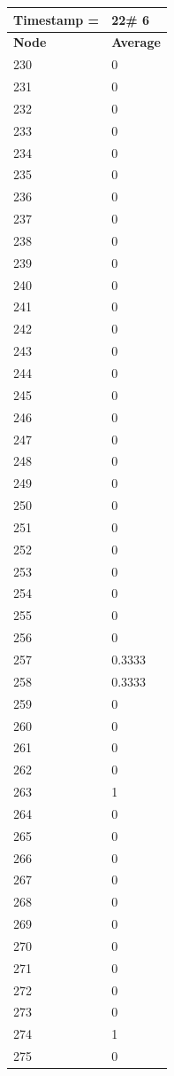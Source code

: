 \begin{tabular}{|l||l|}
\hline
\textbf{Timestamp =} & \textbf{22}\# 6\\\hline
	\textbf{Node} & \textbf{Average} \\ \hline
\hline
	230 & 0 \\ \hline
	231 & 0 \\ \hline
	232 & 0 \\ \hline
	233 & 0 \\ \hline
	234 & 0 \\ \hline
	235 & 0 \\ \hline
	236 & 0 \\ \hline
	237 & 0 \\ \hline
	238 & 0 \\ \hline
	239 & 0 \\ \hline
	240 & 0 \\ \hline
	241 & 0 \\ \hline
	242 & 0 \\ \hline
	243 & 0 \\ \hline
	244 & 0 \\ \hline
	245 & 0 \\ \hline
	246 & 0 \\ \hline
	247 & 0 \\ \hline
	248 & 0 \\ \hline
	249 & 0 \\ \hline
	250 & 0 \\ \hline
	251 & 0 \\ \hline
	252 & 0 \\ \hline
	253 & 0 \\ \hline
	254 & 0 \\ \hline
	255 & 0 \\ \hline
	256 & 0 \\ \hline
	257 & 0.3333 \\ \hline
	258 & 0.3333 \\ \hline
	259 & 0 \\ \hline
	260 & 0 \\ \hline
	261 & 0 \\ \hline
	262 & 0 \\ \hline
	263 & 1 \\ \hline
	264 & 0 \\ \hline
	265 & 0 \\ \hline
	266 & 0 \\ \hline
	267 & 0 \\ \hline
	268 & 0 \\ \hline
	269 & 0 \\ \hline
	270 & 0 \\ \hline
	271 & 0 \\ \hline
	272 & 0 \\ \hline
	273 & 0 \\ \hline
	274 & 1 \\ \hline
	275 & 0 \\ \hline
\end{tabular}

